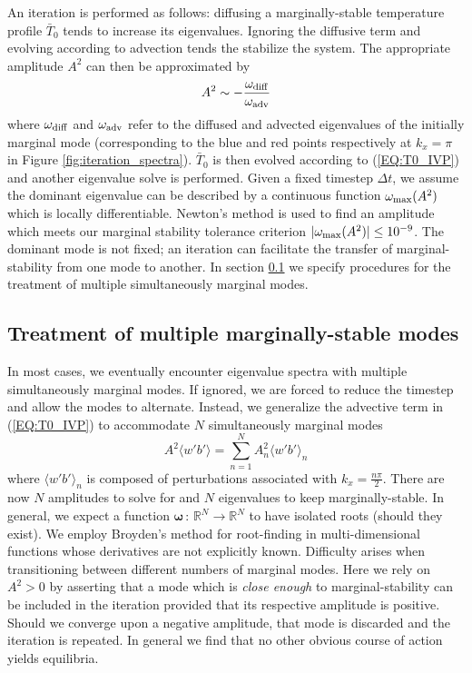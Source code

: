 \documentclass[reprint,amsmath,amssymb,aps]{revtex4-1}
\begin{document}
An iteration is performed as follows: diffusing a marginally-stable temperature profile $\bar{T}_0$ tends to increase its eigenvalues. 
Ignoring the diffusive term and evolving according to advection tends the stabilize the system. The appropriate amplitude $A^2$ can then be approximated by
\begin{equation}
    A^2 \sim -\frac{\omega_{\rm{diff}}}{\omega_{\rm{adv}}}
\end{equation}
where $\omega_{\rm{diff}}$ and $\omega_{\rm{adv}}$ refer to the diffused and advected eigenvalues of the initially marginal mode (corresponding to the blue and red points respectively at $k_x = \pi$ in Figure \ref{fig:iteration_spectra}). 
$\bar{T}_0$ is then evolved according to (\ref{EQ:T0_IVP}) and another eigenvalue solve is performed. 
Given a fixed timestep $\Delta t$, we assume the dominant eigenvalue can be described by a continuous function $\omega_{\rm{max}} (A^2)$ which is locally differentiable. 
Newton's method is used to find an amplitude which meets our marginal stability tolerance criterion $|\omega_{\rm{max}} (A^2)| \leq 10^{-9}$. 
The dominant mode is not fixed; an iteration can facilitate the transfer of marginal-stability from one mode to another. 
In section \ref{sec:multiple_modes} we specify procedures for the treatment of multiple simultaneously marginal modes.

\subsection{Treatment of multiple marginally-stable modes} \label{sec:multiple_modes}
In most cases, we eventually encounter eigenvalue spectra with multiple simultaneously marginal modes. If ignored, we are forced to reduce the timestep and allow the modes to alternate. Instead, we generalize the advective term in (\ref{EQ:T0_IVP}) to accommodate $N$ simultaneously marginal modes
\begin{equation}
    A^2 \langle w' b' \rangle = \sum_{n = 1}^{N} A^2_{n} \langle w' b' \rangle_{n}
\end{equation}
where  $\langle w' b' \rangle_{n}$ is composed of perturbations associated with $k_x = \frac{n\pi}{2}$. 
There are now $N$ amplitudes to solve for and $N$ eigenvalues to keep marginally-stable. 
In general, we expect a function $\mathbf{\omega} \, : \, \mathbb{R}^N \to  \mathbb{R}^N$ to have isolated roots (should they exist). 
We employ Broyden's method for root-finding in multi-dimensional functions whose derivatives are not explicitly known. 
Difficulty arises when transitioning between different numbers of marginal modes. 
Here we rely on $A^2 > 0$ by asserting that a mode which is \textit{close enough} to marginal-stability can be included in the iteration provided that its respective amplitude is positive. 
Should we converge upon a negative amplitude, that mode is discarded and the iteration is repeated. 
In general we find that no other obvious course of action yields equilibria.
\end{document}
